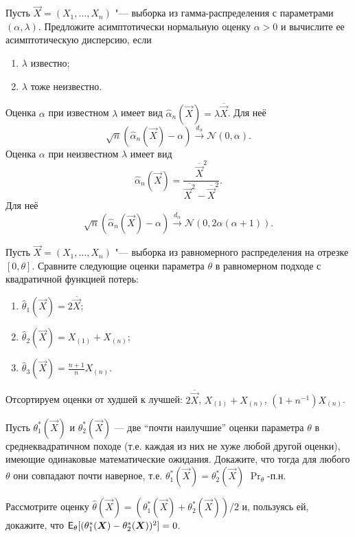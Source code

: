 \begin{problem}
    Пусть $\vec{X} = (X_{1}, \ldots, X_{n})$ "--- выборка из гамма-распределения с параметрами $(\alpha, \lambda)$. Предложите асимптотически нормальную оценку $\alpha > 0$ и вычислите ее асимптотическую дисперсию, если 
    \begin{enumerate}[label=(\alph*)]
        \item $\lambda$ известно;
        \item $\lambda$ тоже неизвестно.
    \end{enumerate}
\end{problem}
\begin{answer}
    Оценка $\alpha$ при известном $\lambda$ имеет вид $\hat{\alpha}_{n}(\vec{X}) = \lambda\overline{\vec{X}}$. Для неё
    \[
        \sqrt{n}(\hat{\alpha}_{n}(\vec{X}) - \alpha) 
        \xrightarrow{d_{\alpha}} \mathcal{N}(0, \alpha).
    \]
    Оценка $\alpha$ при неизвестном $\lambda$ имеет вид 
    \[
        \hat{\alpha}_{n}(\vec{X}) = \frac{\overline{\vec{X}}^{2}}{\overline{\vec{X}^{2}} - \overline{\vec{X}}^{2}}.
    \]
    Для неё
    \[
        \sqrt{n}(\hat{\alpha}_{n}(\vec{X}) - \alpha) 
        \xrightarrow{d_{\alpha}} \mathcal{N}(0, 2\alpha(\alpha + 1)).
    \]
\end{answer}

\begin{problem}
    Пусть $\vec{X} = (X_{1}, \ldots, X_{n})$ "--- выборка из равномерного распределения на отрезке $[0, \theta]$. Сравните следующие оценки параметра $\theta$ в равномерном подходе с квадратичной функцией потерь:
    \begin{enumerate}
        \item $\hat{\theta}_{1}(\vec{X}) = 2\overline{\vec{X}}$;
        \item $\hat{\theta}_{2}(\vec{X}) = X_{(1)} + X_{(n)}$;
        \item $\hat{\theta}_{3}(\vec{X}) = \frac{n + 1}{n}X_{(n)}$.
    \end{enumerate}
\end{problem}
\begin{answer}
    Отсортируем оценки от худшей к лучшей: $2\overline{\vec{X}}$, $X_{(1)} + X_{(n)}$, $(1 + n^{-1})X_{(n)}$.
\end{answer}


\begin{problem}
    Пусть $\theta^{*}_{1}(\vec{X})$ и $\theta^{*}_{2}(\vec{X})$ — две ``почти наилучшие'' оценки параметра $\theta$ в среднеквадратичном походе (т.е. каждая из них не хуже любой другой оценки), имеющие одинаковые математические ожидания. Докажите, что тогда для любого $\theta$ они совпадают почти наверное, т.е. $\theta^{*}_{1}(\vec{X}) = \theta^{*}_{2}(\vec{X})$ $\Pr_{\theta}$-п.н.
\end{problem}
\begin{hint}
    Рассмотрите оценку $\hat{\theta}(\vec{X}) = (\theta^{*}_{1}(\vec{X}) + \theta^{*}_{2}(\vec{X})) / 2$ и, пользуясь ей, докажите, что $\operatorname{\mathsf{E}}_{\theta}[(\theta^{*}_{1}(\bm{X}) - \theta^{*}_{2}(\bm{X}))^{2}] = 0$.
\end{hint}

